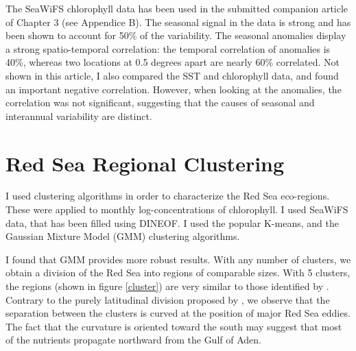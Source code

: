 The SeaWiFS chlorophyll data has been used in the submitted companion article
of Chapter 3 (see Appendice B).  The seasonal signal in the data is strong and
has been shown to account for 50\% of the variability. The seasonal anomalies
display a strong spatio-temporal correlation: the temporal correlation of
anomalies is 40\%, whereas two locations at 0.5 degrees apart are nearly 60\%
correlated. Not shown in this article, I also compared the SST and chlorophyll
data, and found an important negative correlation. However, when looking at the
anomalies, the correlation was not significant, suggesting that the causes of
seasonal and interannual variability are distinct.

\section{Red Sea Regional Clustering}

I used clustering algorithms in order to characterize the Red Sea eco-regions. These
were applied to monthly log-concentrations of chlorophyll. I used SeaWiFS data,
that has been filled using DINEOF. I used the popular K-means, and the Gaussian
Mixture Model (GMM) clustering algorithms.

I found that GMM provides more robust results. With any number of clusters, we
obtain a division of the Red Sea into regions of comparable sizes.  With 5
clusters, the regions (shown in figure \ref{cluster}) are very similar to those
identified by \citet{Raitsos2013}.  Contrary to the purely latitudinal division
proposed by \citet{Raitsos2013}, we observe that the separation between the
clusters is curved at the position of major Red Sea eddies.  The fact that the
curvature is oriented toward the south may suggest that most of the nutrients
propagate northward from the Gulf of Aden.

